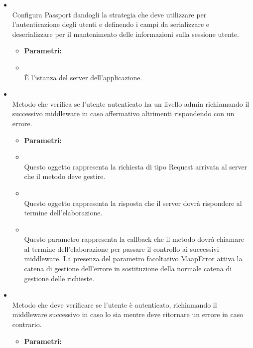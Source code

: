 \begin{itemize}
\begin{itemize}
\end{itemize}
\item[] \textbf{} \\ Configura Passport dandogli la strategia che deve utilizzare per l'autenticazione degli utenti e definendo i campi da serializzare e deserializzare per il mantenimento delle informazioni sulla sessione utente.
\begin{itemize}\addtolength{\itemsep}{-0.5\baselineskip}
\item[] \textbf{Parametri:}
\item[]  \\ È l'istanza del server dell'applicazione.
\end{itemize}
\item[] \textbf{} \\ Metodo che verifica se l'utente autenticato ha un livello admin richiamando il successivo middleware in caso affermativo altrimenti rispondendo con un errore.
\begin{itemize}\addtolength{\itemsep}{-0.5\baselineskip}
\item[] \textbf{Parametri:}
\item[]  \\ Questo oggetto rappresenta la richiesta di tipo Request arrivata al server che il metodo deve gestire.
\item[]  \\ Questo oggetto rappresenta la risposta che il server dovrà rispondere al termine dell'elaborazione.
\item[]  \\ Questo parametro rappresenta la callback che il metodo dovrà chiamare al termine dell'elaborazione per passare il controllo ai successivi middleware. La presenza del parametro facoltativo MaapError attiva la catena di gestione dell'errore in sostituzione della normale catena di gestione delle richieste.
\end{itemize}
\item[] \textbf{} \\ Metodo che deve verificare se l'utente è autenticato, richiamando il middleware successivo in caso lo sia mentre deve ritornare un errore in caso contrario.
\begin{itemize}\addtolength{\itemsep}{-0.5\baselineskip}
\item[] \textbf{Parametri:}

\end{itemize}
\end{itemize}
